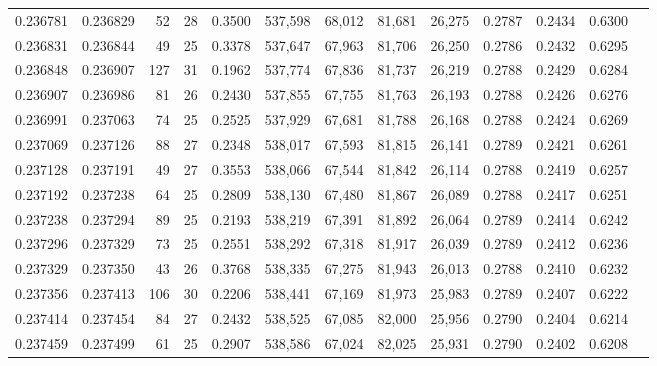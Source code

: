 \begin{tabular}{rrrrrrrrrrrrr}
0.236781 & 0.236829 &  52 &  28 &                                     0.3500 & 537,598 &  68,012 &  81,681 &  26,275 & 0.2787 & 0.2434 & 0.6300 \\
0.236831 & 0.236844 &  49 &  25 &                                     0.3378 & 537,647 &  67,963 &  81,706 &  26,250 & 0.2786 & 0.2432 & 0.6295 \\
0.236848 & 0.236907 & 127 &  31 &                                     0.1962 & 537,774 &  67,836 &  81,737 &  26,219 & 0.2788 & 0.2429 & 0.6284 \\
0.236907 & 0.236986 &  81 &  26 &                                     0.2430 & 537,855 &  67,755 &  81,763 &  26,193 & 0.2788 & 0.2426 & 0.6276 \\
0.236991 & 0.237063 &  74 &  25 &                                     0.2525 & 537,929 &  67,681 &  81,788 &  26,168 & 0.2788 & 0.2424 & 0.6269 \\
0.237069 & 0.237126 &  88 &  27 &                                     0.2348 & 538,017 &  67,593 &  81,815 &  26,141 & 0.2789 & 0.2421 & 0.6261 \\
0.237128 & 0.237191 &  49 &  27 &                                     0.3553 & 538,066 &  67,544 &  81,842 &  26,114 & 0.2788 & 0.2419 & 0.6257 \\
0.237192 & 0.237238 &  64 &  25 &                                     0.2809 & 538,130 &  67,480 &  81,867 &  26,089 & 0.2788 & 0.2417 & 0.6251 \\
0.237238 & 0.237294 &  89 &  25 &                                     0.2193 & 538,219 &  67,391 &  81,892 &  26,064 & 0.2789 & 0.2414 & 0.6242 \\
0.237296 & 0.237329 &  73 &  25 &                                     0.2551 & 538,292 &  67,318 &  81,917 &  26,039 & 0.2789 & 0.2412 & 0.6236 \\
0.237329 & 0.237350 &  43 &  26 &                                     0.3768 & 538,335 &  67,275 &  81,943 &  26,013 & 0.2788 & 0.2410 & 0.6232 \\
0.237356 & 0.237413 & 106 &  30 &                                     0.2206 & 538,441 &  67,169 &  81,973 &  25,983 & 0.2789 & 0.2407 & 0.6222 \\
0.237414 & 0.237454 &  84 &  27 &                                     0.2432 & 538,525 &  67,085 &  82,000 &  25,956 & 0.2790 & 0.2404 & 0.6214 \\
0.237459 & 0.237499 &  61 &  25 &                                     0.2907 & 538,586 &  67,024 &  82,025 &  25,931 & 0.2790 & 0.2402 & 0.6208 \\

\end{tabular}
